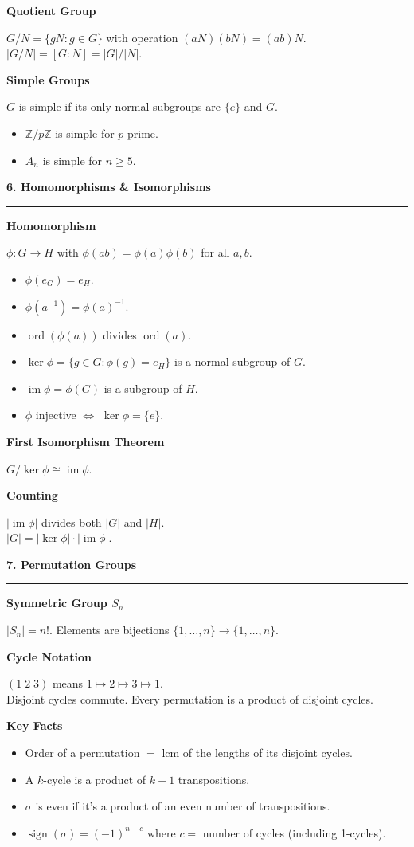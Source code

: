 \documentclass[10pt,twocolumn]{article}
\newcommand{\sect}[1]{\medskip\noindent\textbf{\large #1}\medskip\hrule\smallskip}
\newcommand{\subsect}[1]{\smallskip\noindent\textbf{#1}\par}
\begin{document}
\subsect{Quotient Group}
$G/N = \{gN : g\in G\}$ with operation $(aN)(bN)=(ab)N$.\\
$|G/N|=[G:N]=|G|/|N|$.

\subsect{Simple Groups}
$G$ is simple if its only normal subgroups are $\{e\}$ and $G$.
\begin{itemize}[nosep,leftmargin=*]
\item $\mathbb{Z}/p\mathbb{Z}$ is simple for $p$ prime.
\item $A_n$ is simple for $n\ge 5$.
\end{itemize}

\sect{6. Homomorphisms \& Isomorphisms}

\subsect{Homomorphism}
$\phi\colon G\to H$ with $\phi(ab)=\phi(a)\phi(b)$ for all $a,b$.
\begin{itemize}[nosep,leftmargin=*]
\item $\phi(e_G)=e_H$.
\item $\phi(a^{-1})=\phi(a)^{-1}$.
\item $\operatorname{ord}(\phi(a))$ divides $\operatorname{ord}(a)$.
\item $\ker\phi=\{g\in G:\phi(g)=e_H\}$ is a normal subgroup of $G$.
\item $\operatorname{im}\phi=\phi(G)$ is a subgroup of $H$.
\item $\phi$ injective $\iff$ $\ker\phi=\{e\}$.
\end{itemize}

\subsect{First Isomorphism Theorem}
$G/\ker\phi \cong \operatorname{im}\phi$.

\subsect{Counting}
$|\operatorname{im}\phi|$ divides both $|G|$ and $|H|$.\\
$|G|=|\ker\phi|\cdot|\operatorname{im}\phi|$.

\sect{7. Permutation Groups}

\subsect{Symmetric Group $S_n$}
$|S_n|=n!$. Elements are bijections $\{1,\ldots,n\}\to\{1,\ldots,n\}$.

\subsect{Cycle Notation}
$(1\;2\;3)$ means $1\mapsto 2\mapsto 3\mapsto 1$.\\
Disjoint cycles commute. Every permutation is a product of disjoint cycles.

\subsect{Key Facts}
\begin{itemize}[nosep,leftmargin=*]
\item Order of a permutation $=$ lcm of the lengths of its disjoint cycles.
\item A $k$-cycle is a product of $k-1$ transpositions.
\item $\sigma$ is even if it's a product of an even number of transpositions.
\item $\operatorname{sign}(\sigma)=(-1)^{n-c}$ where $c=$ number of cycles (including 1-cycles).
\end{itemize}
\end{document}
